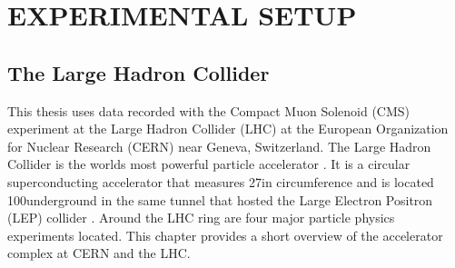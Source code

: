 \part{EXPERIMENTAL SETUP}
\chapter{The Large Hadron Collider}\label{sec:LHC}
\noindent
\justify
This thesis uses data recorded with the Compact Muon Solenoid (CMS) experiment at the Large Hadron Collider (LHC) at the European Organization for Nuclear Research (CERN) near Geneva, Switzerland. 
The Large Hadron Collider is the worlds most powerful particle accelerator \cite{Brüning:782076}. 
It is a circular superconducting accelerator that measures 27\km in circumference and is located 100\m underground in the same tunnel that hosted the Large Electron Positron (LEP) collider \cite{lep}.
Around the LHC ring are four major particle physics experiments located. 
This chapter provides a short overview of the accelerator complex at CERN and the LHC.
\newpage
